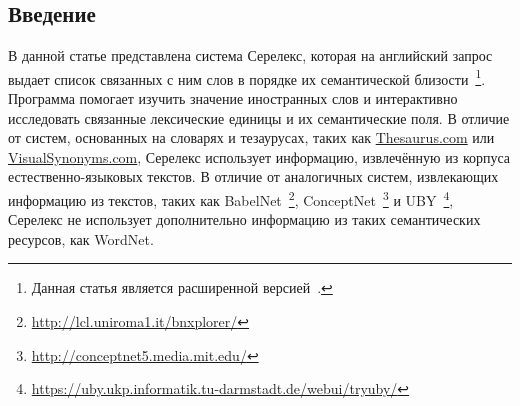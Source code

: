 \documentclass[a4paper,10pt,twoside]{article}
\begin{document}

\author{Панченко А.И.${}^{1,2}$, Романов П.В.${}^2$, Романов А.В${}^1$, \linebreak Филиппович А.Ю.${}^2$, Морозова О.И.${}^1$, Филиппович Ю.Н.${}^2$}



\subsection{Введение}

В данной статье представлена система Серелекс, которая на английский запрос выдает список связанных с ним слов в порядке их семантической близости~\footnote{Данная статья является расширенной версией~\cite{panchenko2013serelex}.}. Программа помогает изучить значение иностранных слов и интерактивно исследовать связанные лексические единицы и их семантические поля. В отличие от систем, основанных на словарях и тезаурусах, таких как \url{Thesaurus.com} или \url{VisualSynonyms.com}, Серелекс использует информацию, извлечённую из корпуса естественно-языковых текстов. В отличие от аналогичных систем, извлекающих информацию из текстов, таких как BabelNet~\footnote{ \url{http://lcl.uniroma1.it/bnxplorer/}}, ConceptNet~\footnote{ \url{http://conceptnet5.media.mit.edu/}} и UBY~\footnote{\url{https://uby.ukp.informatik.tu-darmstadt.de/webui/tryuby/}}, Серелекс не использует дополнительно информацию из таких семантических ресурсов, как WordNet. 
\end{document}

